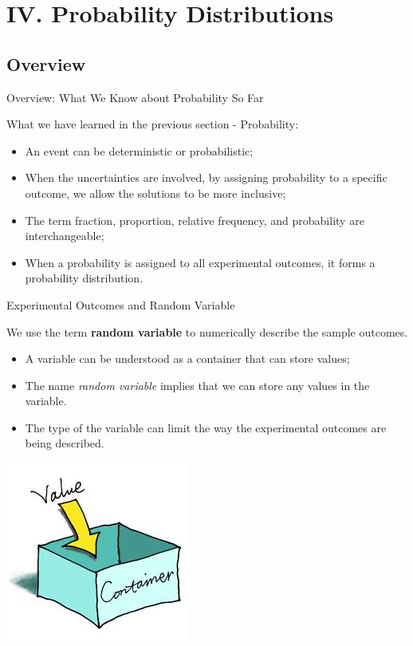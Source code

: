 \documentclass{beamer}
\begin{document}
\section{IV. Probability Distributions}



\subsection{Overview}
\begin{frame}
\subsectionpage
\end{frame}


\begin{frame}{Overview: What We Know about Probability So Far}

What we have learned in the previous section - Probability:
\begin{itemize}
\item An event can be deterministic or probabilistic;
\item When the uncertainties are involved, by assigning probability to a specific outcome, we allow the solutions to be more inclusive;
\item The term fraction, proportion, relative frequency, and probability are interchangeable;
\item When a probability is assigned to all experimental outcomes, it forms a probability distribution. 
\end{itemize}
\end{frame}

\begin{frame}{Experimental Outcomes and Random Variable}

We use the term \textbf{random variable} to numerically describe the sample outcomes.
\begin{itemize}
\item A variable can be understood as a container that can store values;
\item The name \textit{random variable} implies that we can store any values in the variable.
\item The type of the variable can limit the way the experimental outcomes are being described.
\end{itemize}

\begin{center}
\includegraphics[scale=0.4]{images/section4VariableValue.jpg}

\end{center}

\end{frame}
\end{document}
